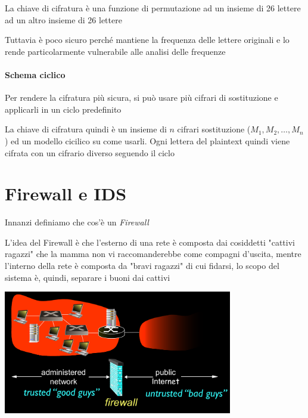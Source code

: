 La chiave di cifratura è una funzione di permutazione ad un insieme di 26 lettere ad un altro insieme di 26 lettere

Tuttavia è poco sicuro perché mantiene la frequenza delle lettere originali e lo rende particolarmente vulnerabile alle analisi delle frequenze

\paragraph{Schema ciclico} Per rendere la cifratura più sicura, si può usare più cifrari di sostituzione e applicarli in un ciclo predefinito

La chiave di cifratura quindi è un insieme di $n$ cifrari sostituzione ($M_1,M_2,\dots,M_n$) ed un modello cicilico su come usarli. Ogni lettera del plaintext quindi viene cifrata con un cifrario diverso seguendo il ciclo 

\section{Firewall e IDS}

Innanzi definiamo che cos'è un \textit{Firewall}


L'idea del Firewall è che l'esterno di una rete è composta dai cosiddetti "cattivi ragazzi" che la mamma non vi raccomanderebbe come compagni d'uscita, mentre l'interno della rete è composta da "bravi ragazzi" di cui fidarsi, lo scopo del sistema è, quindi, separare i buoni dai cattivi

\begin{center}
    \includegraphics[width=10cm]{img/buoni_cattivi_e_firewall.png}
\end{center}

